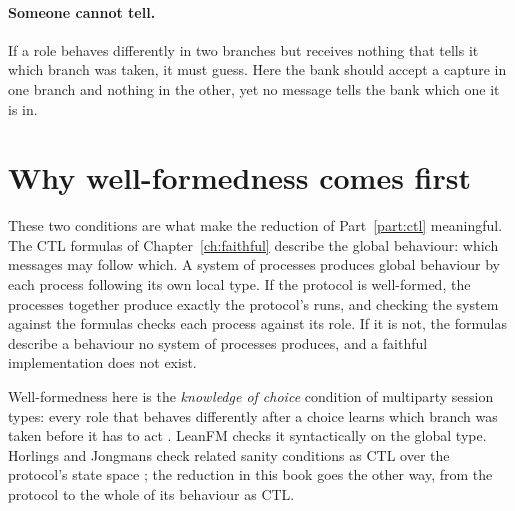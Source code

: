 \paragraph{Someone cannot tell.} If a role behaves differently in two branches but
receives nothing that tells it which branch was taken, it must guess. Here the bank
should accept a capture in one branch and nothing in the other, yet no message tells
the bank which one it is in.



\section{Why well-formedness comes first}

These two conditions are what make the reduction of Part~\ref{part:ctl} meaningful. The
CTL formulas of Chapter~\ref{ch:faithful} describe the global behaviour: which messages
may follow which. A system of processes produces global behaviour by each process
following its own local type. If the protocol is well-formed, the processes together
produce exactly the protocol's runs, and checking the system against the formulas
checks each process against its role. If it is not, the formulas describe a behaviour
no system of processes produces, and a faithful implementation does not exist.

Well-formedness here is the \emph{knowledge of choice} condition of multiparty session
types: every role that behaves differently after a choice learns which branch was
taken before it has to act \citep{honda2008multiparty}. LeanFM checks it syntactically
on the global type. Horlings and Jongmans check related sanity conditions as CTL over
the protocol's state space \citep{horlings2021dcjlint}; the reduction in this book
goes the other way, from the protocol to the whole of its behaviour as CTL.
